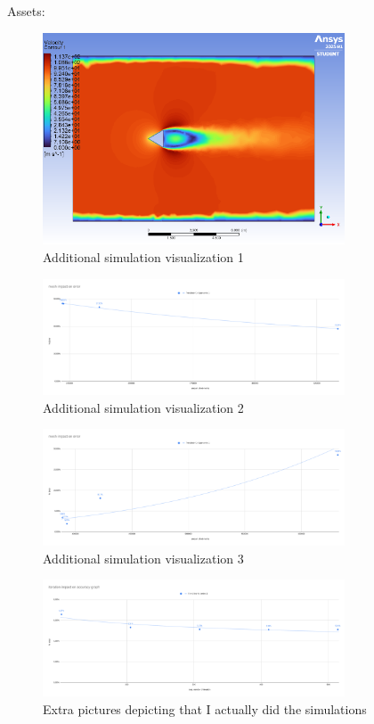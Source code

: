 \documentclass[12pt,a4paper]{article}
\begin{document}
Assets:

\begin{figure}[H]
\centering
\includegraphics[width=0.8\textwidth]{image3.png}
\caption{Additional simulation visualization 1}
\label{fig:asset1}
\end{figure}

\begin{figure}[H]
\centering
\includegraphics[width=0.8\textwidth]{image10.png}
\caption{Additional simulation visualization 2}
\label{fig:asset2}
\end{figure}

\begin{figure}[H]
\centering
\includegraphics[width=0.8\textwidth]{image16.png}
\caption{Additional simulation visualization 3}
\label{fig:asset3}
\end{figure}

\begin{figure}[H]
\centering
\includegraphics[width=0.8\textwidth]{image13.png}
\caption{Extra pictures depicting that I actually did the simulations}
\label{fig:asset4}
\end{figure}
\end{document}
